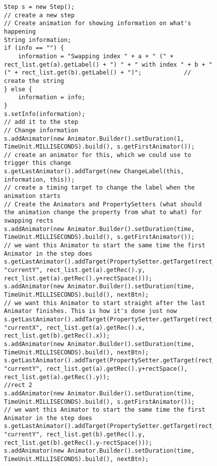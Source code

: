 \begin{figure}
\begin{center}
\begin{verbatim}
Step s = new Step();																																					// create a new step
// Create animation for showing information on what's happening
String information;
if (info == "") {
	information = "Swapping index " + a + " (" + rect_list.get(a).getLabel() + ") " + " with index " + b + " (" + rect_list.get(b).getLabel() + ")";			// create the string
} else {
	information = info;
}
s.setInfo(information);																																			// add it to the step
// Change information
s.addAnimator(new Animator.Builder().setDuration(1, TimeUnit.MILLISECONDS).build(), s.getFirstAnimator());																		// create an animator for this, which we could use to trigger this change
s.getLastAnimator().addTarget(new ChangeLabel(this, information, this));																				// create a timing target to change the label when the animation starts	
// Create the Animators and PropertySetters (what should the animation change the property from what to what) for swapping rects
s.addAnimator(new Animator.Builder().setDuration(time, TimeUnit.MILLISECONDS).build(), s.getFirstAnimator());															// we want this Animator to start the same time the first Animator in the step does															
s.getLastAnimator().addTarget(PropertySetter.getTarget(rect_list.get(a), "currentY", rect_list.get(a).getRec().y, rect_list.get(a).getRec().y+rectSpace()));
s.addAnimator(new Animator.Builder().setDuration(time, TimeUnit.MILLISECONDS).build(), nextBtn);																		// we want this Animator to start straight after the last Animator finishes. This is how it's done just now
s.getLastAnimator().addTarget(PropertySetter.getTarget(rect_list.get(a), "currentX", rect_list.get(a).getRec().x, rect_list.get(b).getRec().x)); 
s.addAnimator(new Animator.Builder().setDuration(time, TimeUnit.MILLISECONDS).build(), nextBtn);
s.getLastAnimator().addTarget(PropertySetter.getTarget(rect_list.get(a), "currentY", rect_list.get(a).getRec().y+rectSpace(), rect_list.get(a).getRec().y));		
//rect 2
s.addAnimator(new Animator.Builder().setDuration(time, TimeUnit.MILLISECONDS).build(), s.getFirstAnimator());															// we want this Animator to start the same time the first Animator in the step does
s.getLastAnimator().addTarget(PropertySetter.getTarget(rect_list.get(b), "currentY", rect_list.get(b).getRec().y, rect_list.get(b).getRec().y-rectSpace()));
s.addAnimator(new Animator.Builder().setDuration(time, TimeUnit.MILLISECONDS).build(), nextBtn);

\end{verbatim}
\end{center}
\end{figure}
